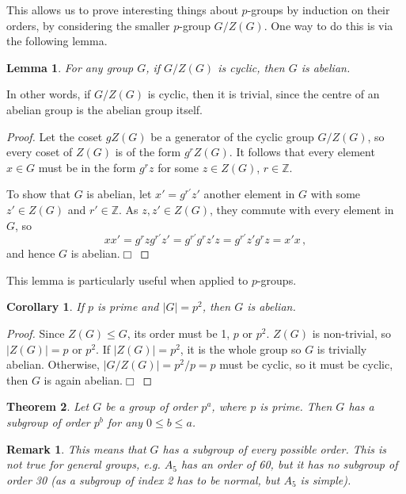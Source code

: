 \documentclass{article}
\theoremstyle{plain}\theoremheaderfont{\normalfont\itshape}\theorembodyfont{\rmfamily}\theoremseparator{.}\newtheorem*{rem}{Remark}\newtheorem*{ex}{Example}\newtheorem*{proof}{Proof}\newtheorem*{altp}{Alternative proof}\newtheorem*{nonex}{Non-Example}
\theoremstyle{plain}\theoremheaderfont{\normalfont\bfseries}\theorembodyfont{\rmfamily}\theoremseparator{.}\newtheorem{thm}{Theorem}[section]\newtheorem{lem}[thm]{Lemma}\newtheorem{prop}[thm]{Proposition}\newtheorem*{cor}{Corollary}\newtheorem{defn}[thm]{Definition}\newtheorem{clm}[thm]{Claim}\newtheorem{clminproof}{Claim}\newtheorem*{notn}{Notation}\newtheorem*{exer}{Exercise}\newtheorem*{lemnn}{Lemma}
\theoremstyle{break}\theoremheaderfont{\normalfont\itshape}\theorembodyfont{\rmfamily}\theoremseparator{.\medskip}\newtheorem*{proofskip}{Proof}\newtheorem*{exs}{Examples}\newtheorem*{rems}{Remarks}\newtheorem*{obs}{Observations}
\theoremstyle{break}\theoremheaderfont{\normalfont\bfseries}\theorembodyfont{\rmfamily}\theoremseparator{.\medskip}\newtheorem{lemskip}[thm]{Lemma}\newtheorem{defnskip}[thm]{Definition}\newtheorem{propskip}[thm]{Proposition}\newtheorem{thmskip}[thm]{Theorem}
\numberwithin{equation}{section}
\newcommand{\qed}{\hfill\ensuremath{\Box}}
\newcommand{\abs}[1]{\left|#1\right|}
\newcommand{\ZZ}{\mathbb{Z}}
\begin{document}
    This allows us to prove interesting things about \(p\)-groups by induction on their orders, by considering the smaller \(p\)-group \(G/Z(G)\). One way to do this is via the following lemma.
    \begin{lem}
        For any group \(G\), if \(G/Z(G)\) is cyclic, then \(G\) is abelian.
    \end{lem}
    In other words, if \(G/Z(G)\) is cyclic, then it is trivial, since the centre of an abelian group is the abelian group itself.
    \begin{proof}
        Let the coset \(gZ(G)\) be a generator of the cyclic group \(G/Z(G)\), so every coset of \(Z(G)\) is of the form \(g^rZ(G)\). It follows that every element \(x\in G\) must be in the form \(g^rz\) for some \(z\in Z(G)\), \(r\in\ZZ\).

        To show that \(G\) is abelian, let \(x'=g^{r'}z'\) another element in \(G\) with some \(z'\in Z(G)\) and \(r'\in\ZZ\). As \(z,z'\in Z(G)\), they commute with every element in \(G\), so
        \[xx'=g^rzg^{r'}z'=g^{r'}g^rz'z=g^{r'}z'g^rz=x'x\,,\]
        and hence \(G\) is abelian.\qed
    \end{proof}
    This lemma is particularly useful when applied to \(p\)-groups.
    \begin{cor}
        If \(p\) is prime and \(\abs{G}=p^2\), then \(G\) is abelian.
    \end{cor}
    \begin{proof}
        Since \(Z(G)\le G\), its order must be 1, \(p\) or \(p^2\). \(Z(G)\) is non-trivial, so \(\abs{Z(G)}=p\) or \(p^2\). If \(\abs{Z(G)}=p^2\), it is the whole group so \(G\) is trivially abelian. Otherwise, \(\abs{G/Z(G)}=p^2/p=p\) must be cyclic, so it must be cyclic, then \(G\) is again abelian.\qed
    \end{proof}
    \begin{thm}
        Let \(G\) be a group of order \(p^a\), where \(p\) is prime. Then \(G\) has a subgroup of order \(p^b\) for any \(0\le b\le a\).
    \end{thm}
    \begin{rem}
        This means that \(G\) has a subgroup of every possible order. This is not true for general groups, e.g. \(A_5\) has an order of 60, but it has no subgroup of order 30 (as a subgroup of index 2 has to be normal, but \(A_5\) is simple).
    \end{rem}
\end{document}
